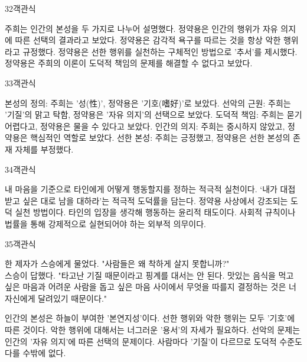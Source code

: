 \documentclass[fs9,seriesRus]{korfarm-base}
\begin{document}
\begin{kfQBlock}{32}{객관식}
\begin{kfChoices}
\kfChoice 주희는 인간의 본성을 두 가지로 나누어 설명했다.
\kfChoice 정약용은 인간의 행위가 자유 의지에 따른 선택의 결과라고 보았다.
\kfChoice 정약용은 감각적 욕구를 따르는 것을 항상 악한 행위라고 규정했다.
\kfChoice 정약용은 선한 행위를 실천하는 구체적인 방법으로 '추서'를 제시했다.
\kfChoice 정약용은 주희의 이론이 도덕적 책임의 문제를 해결할 수 없다고 보았다.
\end{kfChoices}
\end{kfQBlock}
\begin{kfQBlock}{33}{객관식}
\begin{kfChoices}
\kfChoice 본성의 정의: 주희는 '성(性)', 정약용은 '기호(嗜好)'로 보았다.
\kfChoice 선악의 근원: 주희는 '기질'의 맑고 탁함, 정약용은 '자유 의지'의 선택으로 보았다.
\kfChoice 도덕적 책임: 주희는 묻기 어렵다고, 정약용은 물을 수 있다고 보았다.
\kfChoice 인간의 의지: 주희는 중시하지 않았고, 정약용은 핵심적인 역할로 보았다.
\kfChoice 선한 본성: 주희는 긍정했고, 정약용은 선한 본성의 존재 자체를 부정했다.
\end{kfChoices}
\end{kfQBlock}
\begin{kfQBlock}{34}{객관식}
\begin{kfChoices}
\kfChoice 내 마음을 기준으로 타인에게 어떻게 행동할지를 정하는 적극적 실천이다.
\kfChoice ‘내가 대접받고 싶은 대로 남을 대하라’는 적극적 도덕률을 담는다.
\kfChoice 정약용 사상에서 강조되는 도덕 실천 방법이다.
\kfChoice 타인의 입장을 생각해 행동하는 윤리적 태도이다.
\kfChoice 사회적 규칙이나 법률을 통해 강제적으로 실현되어야 하는 외부적 의무이다.
\end{kfChoices}
\end{kfQBlock}
\begin{kfQBlock}{35}{객관식}
\begin{kfEvidence}한 제자가 스승에게 물었다. "사람들은 왜 착하게 살지 못합니까?"   \\\relax
   스승이 답했다. "타고난 기질 때문이라고 핑계를 대서는 안 된다. 맛있는 음식을 먹고 싶은 마음과 어려운 사람을 돕고 싶은 마음 사이에서 무엇을 따를지 결정하는 것은 너 자신에게 달려있기 때문이다."\end{kfEvidence}
\begin{kfChoices}
\kfChoice 인간의 본성은 하늘이 부여한 '본연지성'이다.
\kfChoice 선한 행위와 악한 행위는 모두 '기호'에 따른 것이다.
\kfChoice 악한 행위에 대해서는 너그러운 '용서'의 자세가 필요하다.
\kfChoice 선악의 문제는 인간의 '자유 의지'에 따른 선택의 문제이다.
\kfChoice 사람마다 '기질'이 다르므로 도덕적 수준도 다를 수밖에 없다.
\end{kfChoices}
\end{kfQBlock}
\end{document}
